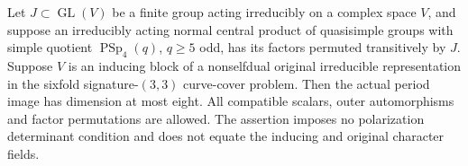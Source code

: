\begin{theorem}
\label{D-OC2-04}
Let $J\subset\operatorname{GL}(V)$ be a finite group acting irreducibly
on a complex space $V$, and suppose an
irreducibly acting normal central product of quasisimple groups
with simple quotient $\operatorname{PSp}_4(q)$, $q\ge5$ odd,
has its factors permuted transitively by $J$. Suppose $V$ is an
inducing block of a nonselfdual original irreducible representation
in the sixfold signature-$(3,3)$ curve-cover problem. Then the
actual period image has dimension at most eight. All compatible
scalars, outer automorphisms and factor permutations are allowed.
The assertion imposes no polarization determinant condition and
does not equate the inducing and original character fields.
\end{theorem}

